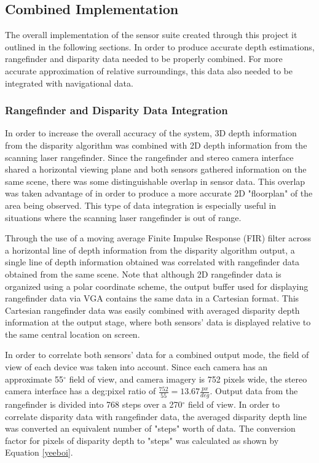 \subsection{Combined Implementation}
The overall implementation of the sensor suite created through this project it outlined in the following sections. In order to produce accurate depth estimations, rangefinder and disparity data needed to be properly combined. For more accurate approximation of relative surroundings, this data also needed to be integrated with navigational data. 
\subsubsection{Rangefinder and Disparity Data Integration}
In order to increase the overall accuracy of the system, 3D depth information from the disparity algorithm was combined with 2D depth information from the scanning laser rangefinder. Since the rangefinder and stereo camera interface shared a horizontal viewing plane and both sensors gathered information on the same scene, there was some distinguishable overlap in sensor data. This overlap was taken advantage of in order to produce a more accurate 2D "floorplan" of the area being observed. This type of data integration is especially useful in situations where the scanning laser rangefinder is out of range.
\par
Through the use of a moving average Finite Impulse Response (FIR) filter across a horizontal line of depth information from the disparity algorithm output, a single line of depth information obtained was correlated with rangefinder data obtained from the same scene. Note that although 2D rangefinder data is organized using a polar coordinate scheme, the output buffer used for displaying rangefinder data via VGA contains the same data in a Cartesian format. This Cartesian rangefinder data was easily combined with averaged disparity depth information at the output stage, where both sensors' data is displayed relative to the same central location on screen. 
\par
In order to correlate both sensors' data for a combined output mode, the field of view of each device was taken into account. Since each camera has an approximate 55$^\circ$ field of view, and camera imagery is 752 pixels wide, the stereo camera interface has a deg:pixel ratio of $\frac{752}{55}=13.67\frac{px}{deg}$. Output data from the rangefinder is divided into 768 steps over a 270$^\circ$ field of view. In order to correlate disparity data with rangefinder data, the averaged disparity depth line was converted an equivalent number of "steps" worth of data. The conversion factor for pixels of disparity depth to "steps" was calculated as shown by Equation \ref{yeeboi}.
